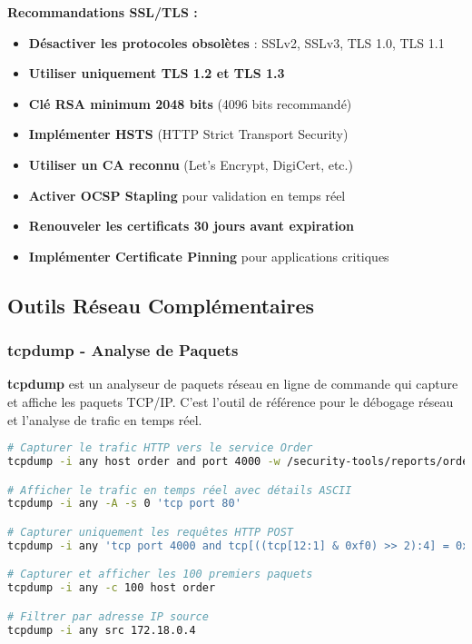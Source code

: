 \documentclass[11pt,a4paper]{report}
\begin{document}
\textbf{Recommandations SSL/TLS :}
\begin{itemize}
    \item \textbf{Désactiver les protocoles obsolètes} : SSLv2, SSLv3, TLS 1.0, TLS 1.1
    \item \textbf{Utiliser uniquement TLS 1.2 et TLS 1.3}
    \item \textbf{Clé RSA minimum 2048 bits} (4096 bits recommandé)
    \item \textbf{Implémenter HSTS} (HTTP Strict Transport Security)
    \item \textbf{Utiliser un CA reconnu} (Let's Encrypt, DigiCert, etc.)
    \item \textbf{Activer OCSP Stapling} pour validation en temps réel
    \item \textbf{Renouveler les certificats 30 jours avant expiration}
    \item \textbf{Implémenter Certificate Pinning} pour applications critiques
\end{itemize}

\subsection{Outils Réseau Complémentaires}

\subsubsection{tcpdump - Analyse de Paquets}

\textbf{tcpdump} est un analyseur de paquets réseau en ligne de commande qui capture et affiche les paquets TCP/IP. C'est l'outil de référence pour le débogage réseau et l'analyse de trafic en temps réel.

\begin{lstlisting}[language=bash, caption=Exemples d'Utilisation de tcpdump]
# Capturer le trafic HTTP vers le service Order
tcpdump -i any host order and port 4000 -w /security-tools/reports/order-traffic.pcap

# Afficher le trafic en temps réel avec détails ASCII
tcpdump -i any -A -s 0 'tcp port 80'

# Capturer uniquement les requêtes HTTP POST
tcpdump -i any 'tcp port 4000 and tcp[((tcp[12:1] & 0xf0) >> 2):4] = 0x504F5354'

# Capturer et afficher les 100 premiers paquets
tcpdump -i any -c 100 host order

# Filtrer par adresse IP source
tcpdump -i any src 172.18.0.4
\end{lstlisting}
\end{document}

